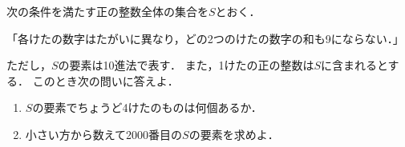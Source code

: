 \documentclass[../../main.tex]{subfiles}
\begin{document}
次の条件を満たす正の整数全体の集合を$S$とおく．
\begin{center}
  「各けたの数字はたがいに異なり，どの2つのけたの数字の和も9にならない．」
\end{center}
ただし，$S$の要素は10進法で表す．
また，1けたの正の整数は$S$に含まれるとする．
このとき次の問いに答えよ．
\begin{enumerate}
  \item $S$の要素でちょうど4けたのものは何個あるか．
  \item 小さい方から数えて2000番目の$S$の要素を求めよ．
\end{enumerate}
\end{document}

